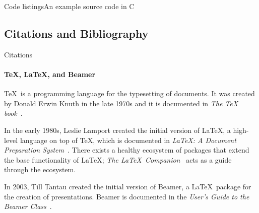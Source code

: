 \documentclass[aspectratio=169]{beamer}
\begin{document}
    \begin{frame}{Code listings}{An example source code in C}
      \sleepSort
    \end{frame}

    \subsection{Citations and Bibliography}
    \begin{frame}[label=citations]{Citations}
      \framesubtitle{\TeX, \LaTeX, and Beamer}

      \justifying\TeX\ is a programming language for the typesetting
      of documents. It was created by Donald Erwin Knuth in the late
      1970s and it is documented in \emph{The \TeX
      book}~\cite{knuth84}.

      In the early 1980s, Leslie Lamport created the initial version
      of \LaTeX, a high-level language on top of \TeX, which is
      documented in \emph{\LaTeX : A Document Preparation
      System}~\cite{lamport94}. There exists a healthy ecosystem of
      packages that extend the base functionality of \LaTeX;
      \emph{The \LaTeX\ Companion}~\cite{MG94} acts as a guide
      through the ecosystem.

      In 2003, Till Tantau created the initial version of Beamer, a
      \LaTeX\ package for the creation of presentations. Beamer is
      documented in the \emph{User's Guide to the Beamer
      Class}~\cite{tantau04}.
    \end{frame}
\end{document}
